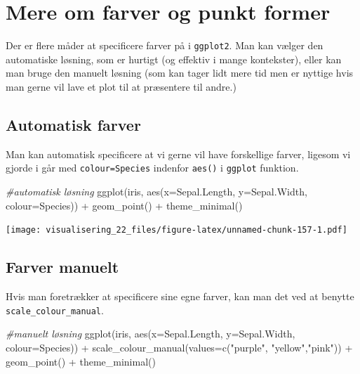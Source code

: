 \documentclass[
]{book}
\newenvironment{Shaded}{\begin{snugshade}}{\end{snugshade}}
\newcommand{\AttributeTok}[1]{\textcolor[rgb]{0.77,0.63,0.00}{#1}}
\newcommand{\CommentTok}[1]{\textcolor[rgb]{0.56,0.35,0.01}{\textit{#1}}}
\newcommand{\FunctionTok}[1]{\textcolor[rgb]{0.00,0.00,0.00}{#1}}
\newcommand{\NormalTok}[1]{#1}
\newcommand{\SpecialCharTok}[1]{\textcolor[rgb]{0.00,0.00,0.00}{#1}}
\newcommand{\StringTok}[1]{\textcolor[rgb]{0.31,0.60,0.02}{#1}}
\begin{document}
\hypertarget{mere-om-farver-og-punkt-former}{%
\section{Mere om farver og punkt former}\label{mere-om-farver-og-punkt-former}}

Der er flere måder at specificere farver på i \texttt{ggplot2}. Man kan vælger den automatiske løsning, som er hurtigt (og effektiv i mange kontekster), eller kan man bruge den manuelt løsning (som kan tager lidt mere tid men er nyttige hvis man gerne vil lave et plot til at præsentere til andre.)

\hypertarget{automatisk-farver}{%
\subsection{Automatisk farver}\label{automatisk-farver}}

Man kan automatisk specificere at vi gerne vil have forskellige farver, ligesom vi gjorde i går med \texttt{colour=Species} indenfor \texttt{aes()} i \texttt{ggplot} funktion.

\begin{Shaded}
\begin{Highlighting}[]
\CommentTok{\#automatisk løsning}
\FunctionTok{ggplot}\NormalTok{(iris, }\FunctionTok{aes}\NormalTok{(}\AttributeTok{x=}\NormalTok{Sepal.Length, }\AttributeTok{y=}\NormalTok{Sepal.Width, }\AttributeTok{colour=}\NormalTok{Species)) }\SpecialCharTok{+}
  \FunctionTok{geom\_point}\NormalTok{() }\SpecialCharTok{+}
  \FunctionTok{theme\_minimal}\NormalTok{() }
\end{Highlighting}
\end{Shaded}

\texttt{[image: visualisering\_22\_files/figure-latex/unnamed-chunk-157-1.pdf]}

\hypertarget{farver-manuelt}{%
\subsection{Farver manuelt}\label{farver-manuelt}}

Hvis man foretrækker at specificere sine egne farver, kan man det ved at benytte \texttt{scale\_colour\_manual}.

\begin{Shaded}
\begin{Highlighting}[]
\CommentTok{\#manuelt løsning}
\FunctionTok{ggplot}\NormalTok{(iris, }\FunctionTok{aes}\NormalTok{(}\AttributeTok{x=}\NormalTok{Sepal.Length, }\AttributeTok{y=}\NormalTok{Sepal.Width, }\AttributeTok{colour=}\NormalTok{Species)) }\SpecialCharTok{+}
  \FunctionTok{scale\_colour\_manual}\NormalTok{(}\AttributeTok{values=}\FunctionTok{c}\NormalTok{(}\StringTok{"purple"}\NormalTok{, }\StringTok{"yellow"}\NormalTok{,}\StringTok{"pink"}\NormalTok{)) }\SpecialCharTok{+}
  \FunctionTok{geom\_point}\NormalTok{() }\SpecialCharTok{+}
  \FunctionTok{theme\_minimal}\NormalTok{() }
\end{Highlighting}
\end{Shaded}
\end{document}
